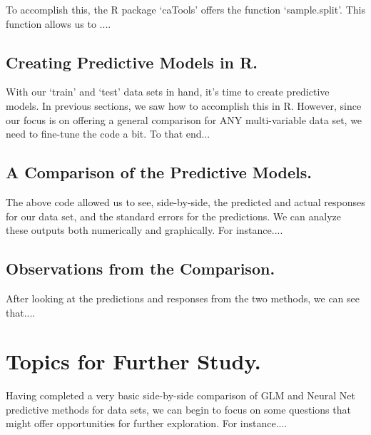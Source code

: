 \documentclass[12pt]{article}
\begin{document}
To accomplish this, the R package `caTools' offers the function `sample.split'.  This function allows us to ....

\subsection{Creating Predictive Models in R.}
With our `train' and `test' data sets in hand, it's time to create predictive models.  In previous sections, we saw how to accomplish this in R.  
However, since our focus is on offering a general comparison for ANY multi-variable data set, we need to fine-tune the code a bit.  To that end...

\subsection{A Comparison of the Predictive Models.}
The above code allowed us to see, side-by-side, the predicted and actual responses for our data set, and the standard errors for the predictions.
We can analyze these outputs both numerically and graphically.  For instance....

\subsection{Observations from the Comparison.}
After looking at the predictions and responses from the two methods, we can see that....


\section{Topics for Further Study.}
Having completed a very basic side-by-side comparison of GLM and Neural Net predictive methods for data sets, we can begin to focus on some 
questions that might offer opportunities for further exploration.  For instance....



\end{document}
